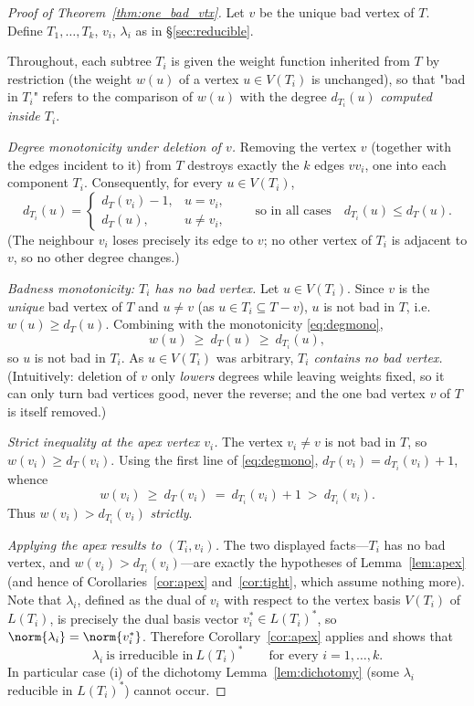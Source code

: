 \begin{proof}[Proof of Theorem~\ref{thm:one_bad_vtx}]
Let $v$ be the unique bad vertex of $T$.  Define $T_1,\dots,T_k$, $v_i$, $\lambda_i$ as in
\S\ref{sec:reducible}.

Throughout, each subtree $T_i$ is given the weight function inherited from $T$ by restriction
(the weight $w(u)$ of a vertex $u\in V(T_i)$ is unchanged), so that "bad in $T_i$" refers to
the comparison of $w(u)$ with the degree $d_{T_i}(u)$ \emph{computed inside $T_i$}.

\smallskip\noindent\emph{Degree monotonicity under deletion of $v$.}
Removing the vertex $v$ (together with the edges incident to it) from $T$ destroys exactly the
$k$ edges $v v_i$, one into each component $T_i$.  Consequently, for every $u\in V(T_i)$,
\begin{equation}
\label{eq:degmono}
d_{T_i}(u)=\begin{cases} d_T(v_i)-1, & u=v_i,\\[2pt] d_T(u), & u\ne v_i,\end{cases}
\qquad\text{so in all cases}\quad d_{T_i}(u)\le d_T(u).
\end{equation}
(The neighbour $v_i$ loses precisely its edge to $v$; no other vertex of $T_i$ is adjacent to
$v$, so no other degree changes.)

\smallskip\noindent\emph{Badness monotonicity: $T_i$ has no bad vertex.}
Let $u\in V(T_i)$.  Since $v$ is the \emph{unique} bad vertex of $T$ and $u\ne v$ (as
$u\in T_i\subseteq T-v$), $u$ is not bad in $T$, i.e. $w(u)\ge d_T(u)$.  Combining with the
monotonicity \eqref{eq:degmono},
\[
w(u)\ \ge\ d_T(u)\ \ge\ d_{T_i}(u),
\]
so $u$ is not bad in $T_i$.  As $u\in V(T_i)$ was arbitrary, \emph{$T_i$ contains no bad
vertex.}  (Intuitively: deletion of $v$ only \emph{lowers} degrees while leaving weights
fixed, so it can only turn bad vertices good, never the reverse; and the one bad vertex $v$
of $T$ is itself removed.)

\smallskip\noindent\emph{Strict inequality at the apex vertex $v_i$.}
The vertex $v_i\ne v$ is not bad in $T$, so $w(v_i)\ge d_T(v_i)$.  Using the first line of
\eqref{eq:degmono}, $d_T(v_i)=d_{T_i}(v_i)+1$, whence
\begin{equation}
\label{eq:strictvi}
w(v_i)\ \ge\ d_T(v_i)\ =\ d_{T_i}(v_i)+1\ >\ d_{T_i}(v_i).
\end{equation}
Thus $w(v_i)>d_{T_i}(v_i)$ \emph{strictly}.

\smallskip\noindent\emph{Applying the apex results to $(T_i,v_i)$.}
The two displayed facts---$T_i$ has no bad vertex, and $w(v_i)>d_{T_i}(v_i)$---are exactly the
hypotheses of Lemma~\ref{lem:apex} (and hence of Corollaries~\ref{cor:apex} and~\ref{cor:tight},
which assume nothing more).  Note that $\lambda_i$, defined as the dual of $v_i$ with respect
to the vertex basis $V(T_i)$ of $L(T_i)$, is precisely the dual basis vector
$v_i^\ast\in L(T_i)^\ast$, so $\norm{\lambda_i}=\norm{v_i^\ast}$.  Therefore
Corollary~\ref{cor:apex} applies and shows that
\[
\lambda_i\ \text{is irreducible in}\ L(T_i)^\ast\qquad\text{for every }i=1,\dots,k.
\]
In particular case \textup{(i)} of the dichotomy Lemma~\ref{lem:dichotomy} (some $\lambda_i$
reducible in $L(T_i)^\ast$) cannot occur.


\end{proof}
